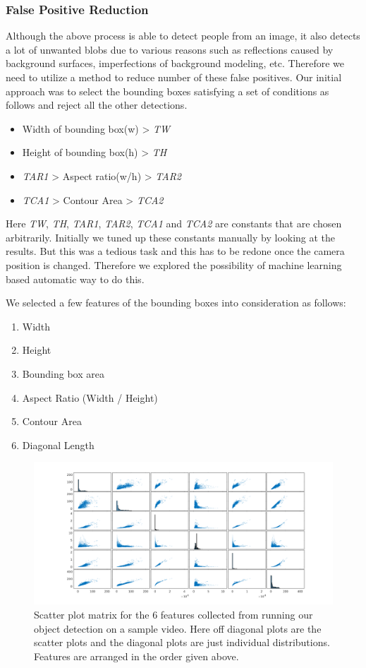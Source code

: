 \documentclass[12pt,a4paper]{report}
\begin{document}
\subsubsection{False Positive Reduction}
Although the above process is able to detect people from an image, it also detects a lot of unwanted blobs due to various reasons such as reflections caused by background surfaces, imperfections of background modeling, etc. Therefore we need to utilize a method to reduce number of these false positives. Our initial approach was to select the bounding boxes satisfying a set of conditions as follows and reject all the other detections.
\begin{itemize}
\item Width of bounding box(w) > \textit{TW}
\item Height of bounding box(h) > \textit{TH}
\item \textit{TAR1} > Aspect ratio(w/h) > \textit{TAR2}
\item \textit{TCA1} > Contour Area > \textit{TCA2}
\end{itemize}
Here \textit{TW}, \textit{TH}, \textit{TAR1}, \textit{TAR2}, \textit{TCA1} and \textit{TCA2} are constants that are chosen arbitrarily. Initially we tuned up these constants manually by looking at the results. But this was a tedious task and this has to be redone once the camera position is changed. Therefore we explored the possibility of machine learning based automatic way to do this.

\noindent We selected a few features of the bounding boxes into consideration as follows:
\begin{enumerate}
\item Width
\item Height
\item Bounding box area
\item Aspect Ratio (Width / Height)
\item Contour Area
\item Diagonal Length
\end{enumerate}

\begin{figure}[H]
\includegraphics[width=\textwidth]{pca/scatter_plots_pca.png}
\centering
\caption{Scatter plot matrix for the 6 features collected from running our object detection on a sample video. Here off diagonal plots are the scatter plots and the diagonal plots are just individual distributions. Features are arranged in the order given above.}
\label{pca1}
\end{figure}
\end{document}
